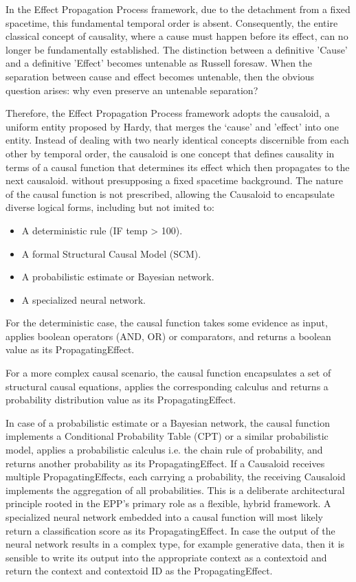 In the Effect Propagation Process framework, due to the detachment from a fixed spacetime, this fundamental temporal order is absent. Consequently, the entire classical concept of causality, where a cause must happen before its effect, can no longer be fundamentally established. The distinction between a definitive 'Cause' and a definitive 'Effect' becomes untenable as Russell foresaw. When the separation between cause and effect becomes untenable, then the obvious question arises: why even preserve an untenable separation?

Therefore, the Effect Propagation Process framework adopts the causaloid, a uniform entity proposed by Hardy\cite{HardyDynamicCausalStructure}, that merges the ‘cause' and 'effect' into one entity. Instead of dealing with two nearly identical concepts discernible from each other by temporal order, the causaloid is one concept that defines causality in terms of a causal function that determines its effect which then propagates to the next causaloid. without presupposing a fixed spacetime background. The nature of the causal function is not prescribed, allowing the Causaloid to encapsulate diverse logical forms, including but not imited to:

\begin{itemize}
    \item A deterministic rule (IF temp > 100).
    \item A formal Structural Causal Model (SCM).
    \item A probabilistic estimate or Bayesian network.
    \item A specialized neural network.
\end{itemize}

For the deterministic case, the causal function takes some evidence as input, applies boolean operators (AND, OR) or comparators, and returns a boolean value as its PropagatingEffect.

For a more complex causal scenario, the causal function encapsulates a set of structural causal equations,
applies the corresponding calculus and returns a probability distribution value as its PropagatingEffect.

In case of a probabilistic estimate or a Bayesian network, the causal function implements a Conditional Probability Table (CPT) or a similar probabilistic model, applies a probabilistic calculus i.e. the chain rule of probability, and returns another probability as its PropagatingEffect. If a Causaloid receives multiple PropagatingEffects, each carrying a probability, the receiving Causaloid implements the aggregation of all probabilities. This is a deliberate architectural principle rooted in the EPP's primary role as a flexible, hybrid framework. A specialized neural network embedded into a causal function will most likely return a classification score as its PropagatingEffect. In case the output of the neural network results in a complex type, for example
generative data, then it is sensible to write its output into the appropriate context as a contextoid and return the context and contextoid ID as the PropagatingEffect.


